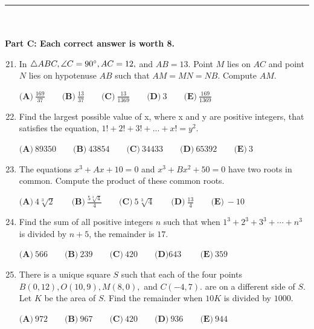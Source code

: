 \documentclass[12pt]{article}
\begin{document}
\par\noindent\rule{\textwidth}{1pt}
\\\\\textbf{Part C: Each correct answer is worth 8.}
     \begin{enumerate}
        \setcounter{enumi}{20}
    \item In $\triangle ABC, \angle C = 90\degree, AC = 12,$ and $AB = 13.$ Point $M$ lies on $AC$ and point $N$ lies on hypotenuse $AB$ such that $AM = MN = NB.$ Compute $AM.$
    
     $\textbf{(A)}\ \frac{169}{37} \qquad \textbf{(B)}\ \frac{13}{37} \qquad \textbf{(C)}\ \frac{13}{1369}\qquad \textbf{(D)}\ 3 \qquad \textbf{(E)}\ \frac{169}{1369}$
     
    \item Find the largest possible value of x, where x and y are positive integers, that satisfies the equation, $1! + 2! + 3! + ... + x! = y^2$.
    
     $\textbf{(A)}\ 89350\qquad \textbf{(B)}\ 43854\qquad \textbf{(C)}\ 34433\qquad \textbf{(D)}\ 65392 \qquad \textbf{(E)}\ 3 $
     
    \item The equations $x^3 + Ax + 10 = 0$ and $x^3 + Bx^2 + 50 = 0$ have two roots in common. Compute the product of these common roots.
    
     $\textbf{(A)}\ 4\sqrt[3]{2} \qquad \textbf{(B)}\ \frac{5\sqrt[3]{4}}{4} \qquad \textbf{(C)}\ 5\sqrt[3]{4}\qquad \textbf{(D)}\ \frac{13}{4} \qquad \textbf{(E)}\ -10$
     
    \item Find the sum of all positive integers $n$ such that when $1^3+2^3+3^3+\cdots +n^3$ is divided by $n+5$, the remainder is $17$.
    
     $\textbf{(A)}\ 566\qquad \textbf{(B)}\ 239\qquad \textbf{(C)}\ 420\qquad \textbf{(D)} 643\  \qquad \textbf{(E)}\ 359$
     
    \item There is a unique square $S$ such that each of the four points $B(0,12), O(10,9), M(8,0),$ and $C(-4,7).$ are on a different side of $S$. Let $K$ be the area of $S$. Find the remainder when $10K$ is divided by $1000$.
    
     $\textbf{(A)}\ 972 \qquad \textbf{(B)}\ 967 \qquad \textbf{(C)}\ 420\qquad \textbf{(D)}\ 936 \qquad \textbf{(E)}\ 944 $

\end{enumerate}
\end{document}
